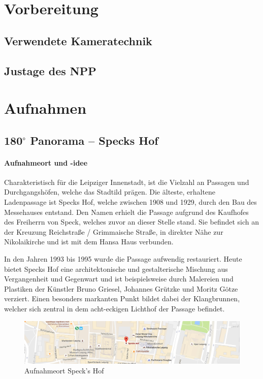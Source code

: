 \documentclass[liststotoc,bibtotoc,fontsize=14pt,]{scrreprt}
\begin{document}
	\chapter{Vorbereitung}
	\label{ch:vorbereitung}
	
	\section{Verwendete Kameratechnik}
	\label{sec:technik}
	
	\section{Justage des NPP}
	\label{sec:npp}
	
	\chapter{Aufnahmen}
	\label{ch:aufnahmen}
	
	\section{180$^\circ$ Panorama -- Speck\grq s Hof}
	\label{sec:specks}

	\subsubsection{Aufnahmeort und -idee}
	Charakteristisch für die Leipziger Innenstadt, ist die Vielzahl an Passagen und Durchgangshöfen, welche das Stadtild prägen. Die älteste, erhaltene Ladenpassage ist Speck\grq s Hof, welche zwischen 1908 und 1929, durch den Bau des Messehauses entstand. Den Namen erhielt die Passage aufgrund des Kaufhofes des Freiherrn von Speck, welches zuvor an dieser Stelle stand. Sie befindet sich an der Kreuzung Reichstraße / Grimmaische Straße, in direkter Nähe zur Nikolaikirche und ist mit dem Hansa Haus verbunden. 
	
	\bigskip
	In den Jahren 1993 bis 1995 wurde die Passage aufwendig restauriert. Heute bietet Speck\grq s Hof eine architektonische und gestalterische Mischung aus Vergangenheit und Gegenwart und ist beispielsweise durch Malereien und Plastiken der Künstler Bruno Griesel, Johannes Grützke und Moritz Götze verziert. Einen besonders markanten Punkt bildet dabei der Klangbrunnen, welcher sich zentral in dem acht-eckigen Lichthof der Passage befindet.
	
			\begin{figure}[H]
				\includegraphics[width=\linewidth]{img/places/sh_map.jpg}
				\caption{Aufnahmeort Speck's Hof}
				\label{img:sh_map}
			\end{figure}
			
\end{document}
